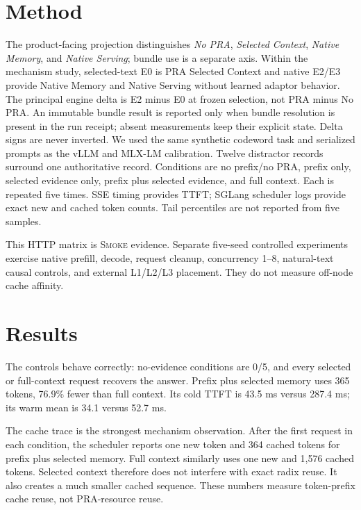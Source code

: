 \documentclass[10pt]{article}
\begin{document}
\section{Method}

The product-facing projection distinguishes \emph{No PRA}, \emph{Selected
Context}, \emph{Native Memory}, and \emph{Native Serving}; bundle use is a
separate axis.  Within the mechanism study, selected-text E0 is PRA Selected
Context and native E2/E3 provide Native Memory and Native Serving without
learned adaptor behavior.  The principal engine delta is E2 minus E0 at frozen
selection, not PRA minus No PRA.  An immutable bundle result is reported only
when bundle resolution is present in the run receipt; absent measurements keep
their explicit state. Delta signs are never inverted.
We used the same synthetic codeword task and serialized prompts as the vLLM and
MLX-LM calibration. Twelve distractor records surround one authoritative
record. Conditions are no prefix/no PRA, prefix only, selected evidence only,
prefix plus selected evidence, and full context. Each is repeated five times.
SSE timing provides TTFT; SGLang scheduler logs provide exact new and cached
token counts. Tail percentiles are not reported from five samples.

This HTTP matrix is \textsc{Smoke} evidence. Separate five-seed controlled
experiments exercise native prefill, decode, request cleanup, concurrency
1--8, natural-text causal controls, and external L1/L2/L3 placement. They do
not measure off-node cache affinity.

\section{Results}
\begin{table}[t]
\centering
\small
\caption{SGLang MLX smoke results. TTFT is milliseconds. Warm cached tokens
come from the scheduler log rather than the SSE usage object.}

\label{tab:sglang-smoke}
\end{table}

The controls behave correctly: no-evidence conditions are 0/5, and every
selected or full-context request recovers the answer. Prefix plus selected
memory uses 365 tokens, 76.9\% fewer than full context. Its cold TTFT is 43.5 ms
versus 287.4 ms; its warm mean is 34.1 versus 52.7 ms.

The cache trace is the strongest mechanism observation. After the first
request in each condition, the scheduler reports one new token and 364 cached
tokens for prefix plus selected memory. Full context similarly uses one new and
1,576 cached tokens. Selected context therefore does not interfere with exact
radix reuse. It also creates a much smaller cached sequence. These numbers
measure token-prefix cache reuse, not PRA-resource reuse.
\end{document}

